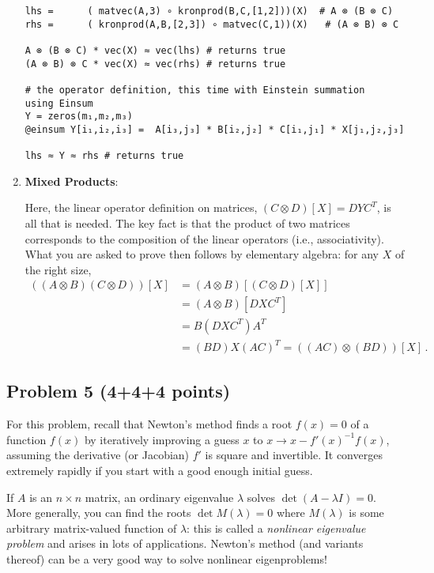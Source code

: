 \documentclass[10pt,oneside]{article}
\begin{document}
\begin{enumerate}
\begin{verbatim}
lhs =      ( matvec(A,3) ∘ kronprod(B,C,[1,2]))(X)  # A ⊗ (B ⊗ C)
rhs =      ( kronprod(A,B,[2,3]) ∘ matvec(C,1))(X)   # (A ⊗ B) ⊗ C

A ⊗ (B ⊗ C) * vec(X) ≈ vec(lhs) # returns true
(A ⊗ B) ⊗ C * vec(X) ≈ vec(rhs) # returns true

# the operator definition, this time with Einstein summation
using Einsum
Y = zeros(m₁,m₂,m₃)
@einsum Y[i₁,i₂,i₃] =  A[i₃,j₃] * B[i₂,j₂] * C[i₁,j₁] * X[j₁,j₂,j₃]

lhs ≈ Y ≈ rhs # returns true
\end{verbatim}


\item \textbf{Mixed Products}:

Here, the linear operator definition on matrices, $(C\otimes D)[X] = DYC^T$, is all that is needed.  The key fact is that the product of two matrices corresponds to the composition of the linear operators (i.e., associativity). What you are asked to prove then follows by elementary algebra: for any $X$ of the right size,
\begin{align*}
\left( (A \otimes B)  (C \otimes D)\right) [X] 
&= (A \otimes B) \left[ (C \otimes D) [X] \right] \\
&=  (A \otimes B) \left[ DXC^T \right] \\
&= B (DXC^T)A^T\\
&= (BD)X(AC)^T = \left((AC)\otimes(BD)\right)[X] \, .
\end{align*}

\end{enumerate}

\newpage
 \subsection*{Problem 5 (4+4+4 points)}

For this problem, recall that Newton's method finds a root $f(x)=0$ of a function $f(x)$ by iteratively improving a guess $x$ to $x \to x - f'(x)^{-1} f(x)$, assuming the derivative (or Jacobian) $f'$ is square and invertible.  It converges extremely rapidly if you start with a good enough initial guess.

If $A$ is an $n \times n$ matrix, an ordinary eigenvalue $\lambda$ solves $\det(A - \lambda I) = 0$.   More generally, you can find the roots $\det M(\lambda) = 0$ where $M(\lambda)$ is some arbitrary matrix-valued function of $\lambda$: this is called a \emph{nonlinear eigenvalue problem} and arises in lots of applications.  Newton's method (and variants thereof) can be a very good way to solve nonlinear eigenproblems!
\end{document}
